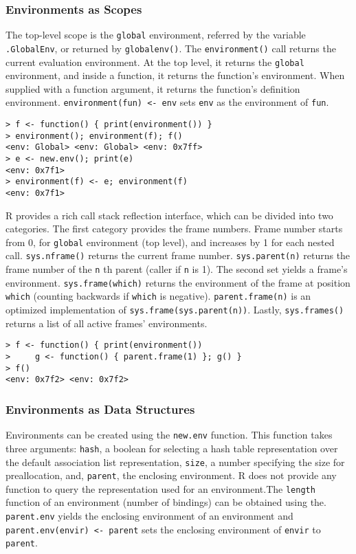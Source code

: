 \documentclass[10pt,review,sigplan,anonymous=true]{acmart}
\newcommand{\code}[1]{\lstinline |#1|\xspace}
\newcommand{\newEnv}{\code{new.env}}
\newcommand{\parentEnv}{\code{parent.env}}
\begin{document}
\subsubsection{Environments as Scopes}
The top-level scope is the \code{global} environment, referred by the variable
\code{.GlobalEnv}, or returned by \code{globalenv()}. The \code{environment()}
call returns the current evaluation environment. At the top level, it returns
the \code{global} environment, and inside a function, it returns the function's
environment. When supplied with a function argument, it returns the function's
definition environment. \code{environment(fun) <- env} sets \code{env} as the
environment of \code{fun}.

\begin{lstlisting}
> f <- function() { print(environment()) }
> environment(); environment(f); f()
<env: Global> <env: Global> <env: 0x7ff>
> e <- new.env(); print(e)
<env: 0x7f1>
> environment(f) <- e; environment(f)
<env: 0x7f1>
\end{lstlisting}

R provides a rich call stack reflection interface, which can be divided into two
categories. The first category provides the frame numbers. Frame number starts
from 0, for \code{global} environment (top level), and increases by 1 for each
nested call. \code{sys.nframe()} returns the current frame number.
\code{sys.parent(n)} returns the frame number of the \code{n}th parent (caller
if \code{n} is 1). The second set yields a frame's environment.
\code{sys.frame(which)} returns the environment of the frame at position
\code{which} (counting backwards if \code{which} is negative).
\code{parent.frame(n)} is an optimized implementation of
\code{sys.frame(sys.parent(n))}. Lastly, \code{sys.frames()} returns a list of
all active frames' environments.

\begin{lstlisting}
> f <- function() { print(environment())
>     g <- function() { parent.frame(1) }; g() }
> f()
<env: 0x7f2> <env: 0x7f2>
\end{lstlisting}

\subsubsection{Environments as Data Structures}
Environments can be created using the \newEnv function. This function takes
three arguments: \code{hash}, a boolean for selecting a hash table
representation over the default association list representation, \code{size}, a
number specifying the size for preallocation, and, \code{parent}, the enclosing
environment. R does not provide any function to query the representation used
for an environment.The \code{length} function of an environment (number of
bindings) can be obtained using the. \parentEnv yields the enclosing environment
of an environment and \code{parent.env(envir) <- parent} sets the enclosing
environment of \code{envir} to \code{parent}.
\end{document}
